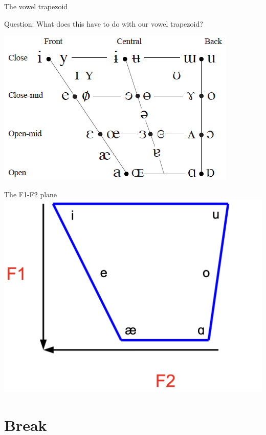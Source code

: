 \documentclass[professionalfonts]{beamer}
\begin{document}
\begin{frame}{The vowel trapezoid}
    \begin{block}{Question:}
        What does this have to do with our vowel trapezoid?
    \end{block}
    \begin{center}
        \includegraphics[width=0.75\linewidth]{figs/IPAVowels.png}
    \end{center}
\end{frame}

\begin{frame}{The F1-F2 plane}
    \includegraphics[width = \linewidth]{figs/F1xF2.jpg}
\end{frame}

\section*{Break}
\end{document}
